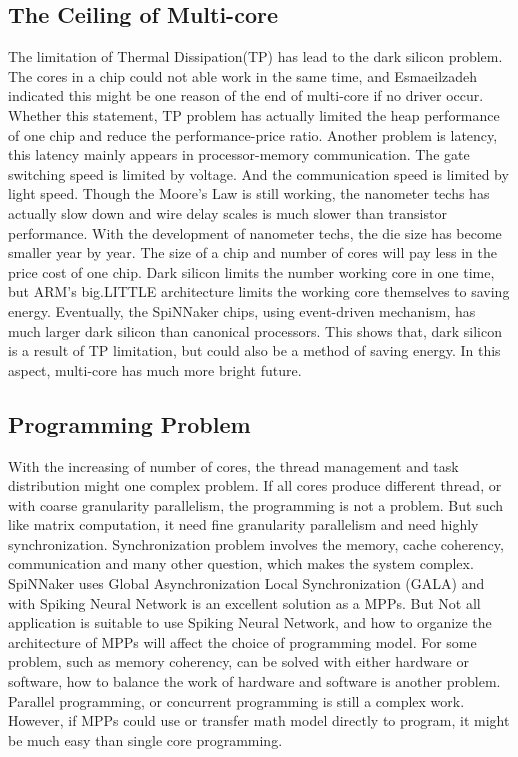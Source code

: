 \subsection{The Ceiling of Multi-core}
The limitation of Thermal Dissipation(TP) has lead to the dark silicon\cite{esmaeilzadeh2011dark} problem\cite{taylor2012dark}. The cores in a chip could not able work in the same time, and Esmaeilzadeh indicated this might be one reason of the end of multi-core if no driver occur\cite{emer2002asim}. Whether this statement, TP problem has actually limited the heap performance of one chip and reduce the performance-price ratio.
Another problem is latency, this latency mainly appears in processor-memory communication\cite{hennessy2017computer}. The gate switching speed is limited by voltage. And the communication speed is limited by light speed. Though the Moore’s Law is still working, the nanometer techs has actually slow down and wire delay scales is much slower than transistor performance\cite{hennessy2017computer}.
With the development of nanometer techs, the die size has become smaller year by year. The size of a chip and number of cores will pay less in the price cost of one chip. Dark silicon limits the number working core in one time, but ARM’s big.LITTLE architecture limits the working core themselves to saving energy. Eventually, the SpiNNaker chips, using event-driven mechanism, has much larger dark silicon than canonical processors. This shows that, dark silicon is a result of TP limitation, but could also be a method of saving energy. In this aspect, multi-core has much more bright future.

\subsection{Programming Problem}
With the increasing of number of cores, the thread management and task distribution might one complex problem. If all cores produce different thread, or with coarse granularity parallelism, the programming is not a problem. But such like matrix computation, it need fine granularity parallelism and need highly synchronization. Synchronization problem involves the memory, cache coherency, communication and many other question, which makes the system complex. SpiNNaker uses Global Asynchronization Local Synchronization (GALA) and with Spiking Neural Network is an excellent solution as a MPPs. But Not all application is suitable to use Spiking Neural Network, and how to organize the architecture of MPPs will affect the choice of programming model. For some problem, such as memory coherency, can be solved with either hardware or software, how to balance the work of hardware and software is another problem.
Parallel programming, or concurrent programming is still a complex work. However, if MPPs could use or transfer math model directly to program, it might be much easy than single core programming. 

